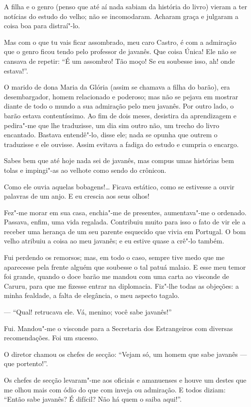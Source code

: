 A filha e o genro (penso que até aí nada sabiam da história do livro)
vieram a ter notícias do estudo do velho; não se incomodaram. Acharam
graça e julgaram a coisa boa para distraí"-lo.

Mas com o que tu vais ficar assombrado, meu caro Castro, é com a
admiração que o genro ficou tendo pelo professor de javanês. Que coisa
Única! Ele não se cansava de repetir: ``É um assombro! Tão moço! Se eu
soubesse isso, ah! onde estava!''.

O marido de dona Maria da Glória
(assim se chamava a filha do barão), era desembargador, homem
relacionado e poderoso; mas não se pejava em mostrar diante de todo o
mundo a sua admiração pelo meu javanês. Por outro lado, o barão estava
contentíssimo. Ao fim de dois meses, desistira da aprendizagem e
pedira"-me que lhe traduzisse, um dia sim outro não, um trecho do livro
encantado. Bastava entendê"-lo, disse ele; nada se opunha que outrem o
traduzisse e ele ouvisse. Assim evitava a fadiga do estudo e cumpria o
encargo.

Sabes bem que até hoje nada sei de javanês, mas compus umas histórias
bem tolas e impingi"-as ao velhote como sendo do crônicon.

Como ele ouvia aquelas bobagens!\ldots{} Ficava estático, como se estivesse a
ouvir palavras de um anjo. E eu crescia aos seus olhos!

Fez"-me morar em sua casa, enchia"-me de presentes, aumentava"-me o
ordenado. Passava, enfim, uma vida regalada. Contribuiu muito para isso
o fato de vir ele a receber uma herança de um seu parente esquecido que
vivia em Portugal. O bom velho atribuiu a coisa ao meu javanês; e eu
estive quase a crê"-lo também.

Fui perdendo os remorsos; mas, em todo o caso, sempre tive medo que me
aparecesse pela frente alguém que soubesse o tal patuá malaio. E esse
meu temor foi grande, quando o doce barão me mandou com uma carta ao
visconde de Caruru, para que me fizesse entrar na diplomacia. Fiz"-lhe
todas as objeções: a minha fealdade, a falta de elegância, o meu aspecto
tagalo.

--- ``Qual! retrucava ele. Vá, menino; você sabe javanês!''

Fui. Mandou"-me o visconde para a Secretaria dos Estrangeiros com
diversas recomendações. Foi um sucesso.

O diretor chamou os chefes de secção: ``Vejam só, um homem que sabe
javanês --- que portento!''.

Os chefes de secção levaram"-me aos oficiais e amanuenses e houve um
destes que me olhou mais com ódio do que com inveja ou admiração. E
todos diziam: ``Então sabe javanês? É difícil? Não há quem o saiba
aqui!''.

